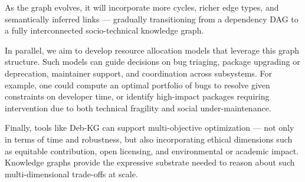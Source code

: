 \documentclass[10pt,oneside,a4paper, twocolumn]{article}
\begin{document}
    As the graph evolves, it will incorporate more cycles, richer edge types, and semantically inferred links — gradually transitioning from a dependency DAG to a fully interconnected socio-technical knowledge graph.

    In parallel, we aim to develop resource allocation models that leverage this graph structure.
    Such models can guide decisions on bug triaging, package upgrading or deprecation, maintainer support, and coordination across subsystems.
    For example, one could compute an optimal portfolio of bugs to resolve given constraints on developer time, or identify high-impact packages requiring intervention due to both technical fragility and social under-maintenance.

    Finally, tools like Deb-KG can support multi-objective optimization — not only in terms of time and robustness, but also incorporating ethical dimensions such as equitable contribution, open licensing, and environmental or academic impact.
    Knowledge graphs provide the expressive substrate needed to reason about such multi-dimensional trade-offs at scale.


    
    
\end{document}
